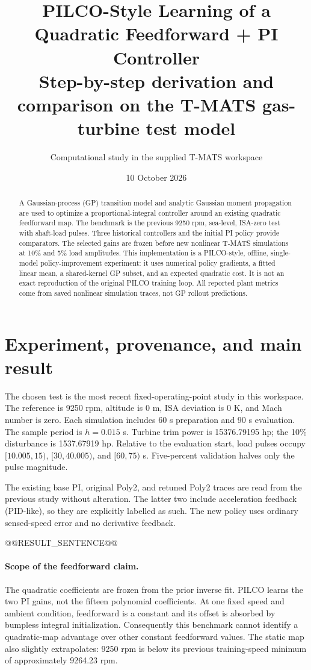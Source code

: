 \documentclass[11pt,a4paper]{article}
\title{PILCO-Style Learning of a Quadratic Feedforward + PI Controller\\\large Step-by-step derivation and comparison on the T-MATS gas-turbine test model}
\author{Computational study in the supplied T-MATS workspace}
\date{10 October 2026}
\begin{document}
\maketitle
\begin{abstract}
A Gaussian-process (GP) transition model and analytic Gaussian moment propagation are used to optimize a proportional-integral controller around an existing quadratic feedforward map. The benchmark is the previous 9250 rpm, sea-level, ISA-zero test with shaft-load pulses. Three historical controllers and the initial PI policy provide comparators. The selected gains are frozen before new nonlinear T-MATS simulations at 10\% and 5\% load amplitudes. This implementation is a PILCO-style, offline, single-model policy-improvement experiment: it uses numerical policy gradients, a fitted linear mean, a shared-kernel GP subset, and an expected quadratic cost. It is not an exact reproduction of the original PILCO training loop. All reported plant metrics come from saved nonlinear simulation traces, not GP rollout predictions.
\end{abstract}
\section{Experiment, provenance, and main result}
The chosen test is the most recent fixed-operating-point study in this workspace. The reference is 9250 rpm, altitude is 0 m, ISA deviation is 0 K, and Mach number is zero. Each simulation includes 60 s preparation and 90 s evaluation. The sample period is $h=0.015$ s. Turbine trim power is 15376.79195 hp; the 10\% disturbance is 1537.67919 hp. Relative to the evaluation start, load pulses occupy $[10.005,15)$, $[30,40.005)$, and $[60,75)$ s. Five-percent validation halves only the pulse magnitude.

The existing base PI, original Poly2, and retuned Poly2 traces are read from the previous study without alteration. The latter two include acceleration feedback (PID-like), so they are explicitly labelled as such. The new policy uses ordinary sensed-speed error and no derivative feedback.

@@RESULT_SENTENCE@@

\paragraph{Scope of the feedforward claim.} The quadratic coefficients are frozen from the prior inverse fit. PILCO learns the two PI gains, not the fifteen polynomial coefficients. At one fixed speed and ambient condition, feedforward is a constant and its offset is absorbed by bumpless integral initialization. Consequently this benchmark cannot identify a quadratic-map advantage over other constant feedforward values. The static map also slightly extrapolates: 9250 rpm is below its previous training-speed minimum of approximately 9264.23 rpm.
\end{document}
